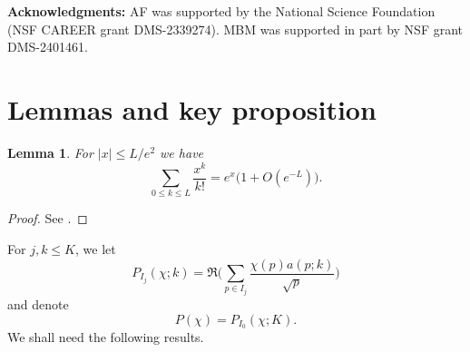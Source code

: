 \documentclass[12pt, reqno]{amsart}
\newtheorem{lemma}[theorem]{Lemma}
\numberwithin{equation}{section}
\numberwithin{theorem}{section}
\numberwithin{equation}{section}
\begin{document}
\textbf{Acknowledgments:} AF was supported by the National Science Foundation (NSF CAREER grant DMS-2339274). MBM was supported in part by NSF grant DMS-2401461.

\section{Lemmas and key proposition}
\label{lemmas}
\begin{lemma}\label{exptrunc}
For $|x|\leq L/e^2$ we have
\begin{equation*}
\sum_{0\leq k\leq L} \frac{x^k}{k!}=e^{x}\big(1+O( e^{-L})\big).
\end{equation*}
\end{lemma}
\begin{proof}
See \cite[Lemma 1]{RS1}.
\end{proof}

For $j,k \leq K$, we let
$$P_{I_j}(\chi; k) = \Re\bigg(\sum_{p \in I_j} \frac{\chi(p) a(p;k)}{\sqrt{p}}\bigg)$$ and denote
\[
P(\chi)=P_{I_0}(\chi; K).
\]
 We shall need the following results.
\end{document}
